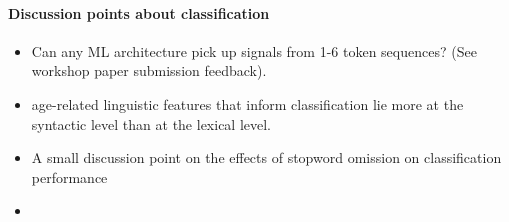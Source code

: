 \paragraph{Discussion points about classification}
\begin{itemize}
    \item Can any ML architecture pick up signals from 1-6 token sequences? (See workshop paper submission feedback).
    \item age-related linguistic features that inform classification lie more at the syntactic level than at the lexical level.
    \item A small discussion point on the effects of stopword omission on classification performance
    \item {}
\end{itemize}

